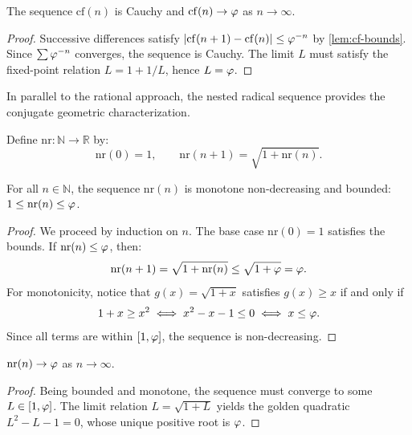\begin{Theorem}%
  \label{thm:cf-converges}
The sequence $\mathrm{cf}(n)$ is Cauchy and $\mathrm{cf}(n)\to\varphi$ as $n\to\infty$.
\end{Theorem}

\begin{proof}
Successive differences satisfy $|\mathrm{cf}(n+1)-\mathrm{cf}(n)|\le\varphi^{-n}$ by \cref{lem:cf-bounds}. Since $\sum\varphi^{-n}$ converges, the sequence is Cauchy. The limit $L$ must satisfy the fixed-point relation $L = 1 + 1/L$, hence $L = \varphi$.
\end{proof}

In parallel to the rational approach, the nested radical sequence provides the conjugate geometric characterization.

\begin{Definition}\label{def:nr-seq}
Define $\mathrm{nr}\colon\mathbb{N}\to\mathbb{R}$ by:
\begin{equation}\label{eq:nr-def}
  \mathrm{nr}(0)=1, \qquad \mathrm{nr}(n{+}1)=\sqrt{1+\mathrm{nr}(n)}.
\end{equation}
\end{Definition}

\begin{Lemma}\label{lem:nr-bounds}
For all $n \in \mathbb{N}$, the sequence $\mathrm{nr}(n)$ is monotone non-decreasing and bounded: $1 \le \mathrm{nr}(n) \le \varphi$.
\end{Lemma}

\begin{proof}
We proceed by induction on $n$. The base case $\mathrm{nr}(0)=1$ satisfies the bounds. If $\mathrm{nr}(n)\le\varphi$, then:
\[
  \mathrm{nr}(n+1) = \sqrt{1+\mathrm{nr}(n)} \le \sqrt{1+\varphi} = \varphi.
\]
For monotonicity, notice that $g(x)=\sqrt{1+x}$ satisfies $g(x) \ge x$ if and only if
\[
  1 + x \ge x^2 \iff x^2 - x - 1 \le 0 \iff x \le \varphi.
\]
Since all terms are within $[1, \varphi]$, the sequence is non-decreasing.
\end{proof}

\begin{Theorem}%
  \label{thm:nr-converges}
$\mathrm{nr}(n)\to\varphi$ as $n\to\infty$.
\end{Theorem}

\begin{proof}
Being bounded and monotone, the sequence must converge to some $L \in [1, \varphi]$. The limit relation $L = \sqrt{1+L}$ yields the golden quadratic $L^2 - L - 1 = 0$, whose unique positive root is $\varphi$.
\end{proof}


